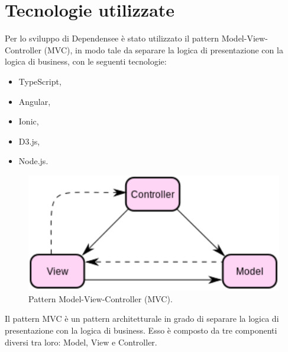 \section{Tecnologie utilizzate}\label{tecnologie}
Per lo sviluppo di Dependensee \`{e} stato utilizzato il pattern Model-View-Controller (MVC), in modo tale da separare la logica di presentazione con la logica di business, con le seguenti tecnologie:
\begin{itemize}
    \item TypeScript,
    \item Angular,
    \item Ionic,
    \item D3.js,
    \item Node.js.
\end{itemize}
\begin{figure}[ht]
    \centering
    \includegraphics[width=.5\columnwidth]{capitoli/figure/mvc}
    \caption{Pattern Model-View-Controller (MVC).}
    \label{fig:pattern_mvc}
\end{figure}
Il pattern MVC \`{e} un pattern architetturale in grado di separare la logica di presentazione con la logica di business. Esso \`{e} composto da tre componenti diversi tra loro: Model, View e Controller.
